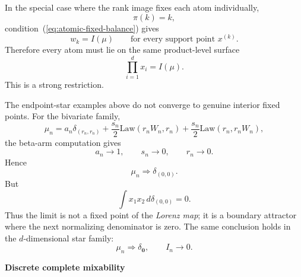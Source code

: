 \documentclass[onecolumn]{article}
\begin{document}
In the special case where the rank image fixes each atom individually, 
\begin{equation*}
\pi (k)=k,
\end{equation*}%
condition~(\ref{eq:atomic-fixed-balance}) gives 
\begin{equation*}
w_{k}=I(\mu )\qquad \text{for every support point }x^{(k)}.
\end{equation*}%
Therefore every atom must lie on the same product-level surface 
\begin{equation*}
\prod_{i=1}^{d}x_{i}=I(\mu ).
\end{equation*}%
This is a strong restriction.

The endpoint-star examples above do not converge to genuine interior fixed
points. For the bivariate family, 
\begin{equation*}
\mu _{n}=a_{n}\delta _{(r_{n},r_{n})}+\frac{s_{n}}{2}\mathrm{Law}%
(r_{n}W_{n},r_{n})+\frac{s_{n}}{2}\mathrm{Law}(r_{n},r_{n}W_{n}),
\end{equation*}%
the beta-arm computation gives 
\begin{equation*}
a_{n}\rightarrow 1,\qquad s_{n}\rightarrow 0,\qquad r_{n}\rightarrow 0.
\end{equation*}%
Hence 
\begin{equation*}
\mu _{n}\Rightarrow \delta _{(0,0)}.
\end{equation*}%
But 
\begin{equation*}
\int x_{1}x_{2}\,d\delta _{(0,0)}=0.
\end{equation*}%
Thus the limit is not a fixed point of the \textit{Lorenz map}; it is a
boundary attractor where the next normalizing denominator is zero. The same
conclusion holds in the $d$-dimensional star family: 
\begin{equation*}
\mu _{n}\Rightarrow \delta _{\mathbf{0}},\qquad I_{n}\rightarrow 0.
\end{equation*}

\begin{flushleft}
\textbf{Discrete complete mixability}
\end{flushleft}
\end{document}
